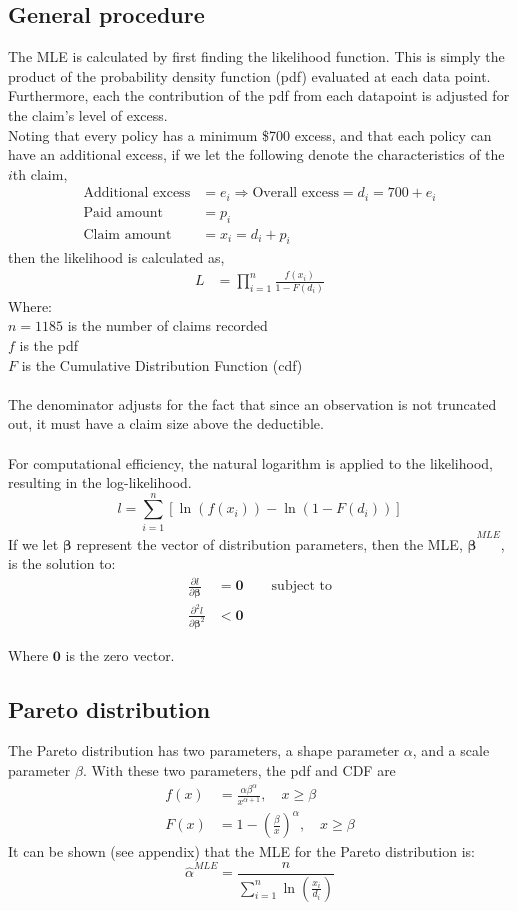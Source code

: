 \documentclass{article}
\begin{document}
	\subsection{General procedure}
	The MLE is calculated by first finding the likelihood function. This is simply the product of the probability density function (pdf) evaluated at each data point. Furthermore, each the contribution of the pdf from each datapoint is adjusted for the claim's level of excess. \\
	Noting that every policy has a minimum \$700 excess, and that each policy can have an additional excess, if we let the following denote the characteristics of the $i$th claim,	
	\begin{align*}
		\text{Additional excess} &= e_i \Rightarrow	\text{Overall excess} = d_i = 700 + e_i\\
		\text{Paid amount} &= p_i\\
		\text{Claim amount} &= x_i = d_i + p_i
	\end{align*}
	then the likelihood is calculated as,
	\begin{align*}
		L &= \prod_{i = 1}^{n}\frac{f(x_i)}{1-F(d_i)}
	\end{align*}
	Where:\\
	$n = 1185$ is the number of claims recorded\\
	$f$ is the pdf\\
	$F$ is the Cumulative Distribution Function (cdf)\\
	\\
	The denominator adjusts for the fact that since an observation is not truncated out, it must have a claim size above the deductible.\\
	\\
	For computational efficiency, the natural logarithm is applied to the likelihood, resulting in the log-likelihood.
	$$l=\sum_{i=1}^{n}\left[\ln(f(x_i)) - \ln(1-F(d_i))\right]$$
	If we let $\bm\beta$ represent the vector of distribution parameters, then the MLE, $\bm{\hat{\beta}}^{MLE}$, is the solution to:
	\begin{align*}
		\frac{\partial l}{\partial \bm{\beta}} &= \bm{0} \qquad \text{subject to}\\
		\frac{\partial ^2 l}{\partial \bm{\beta}^2} &< \bm{0}
	\end{align*}

	Where $\bm 0$ is the zero vector.
	
	\subsection{Pareto distribution}
	The Pareto distribution has two parameters, a shape parameter $ \alpha $, and a scale parameter $ \beta $. With these two parameters, the pdf and CDF are 
	\begin{align*}
		f(x) &= \frac{\alpha \beta^\alpha}{x^{\alpha + 1}}, \quad x \geq \beta\\
		F(x) &= 1-\left(\frac{\beta}{x}\right)^\alpha, \quad x \geq \beta
	\end{align*}
	It can be shown (see appendix) that the MLE for the Pareto distribution is:
	$$\hat{\alpha}^{MLE} = \frac{n}{\sum_{i=1}^{n}\ln\left(\frac{x_i}{d_i}\right)}$$
	
\end{document}

